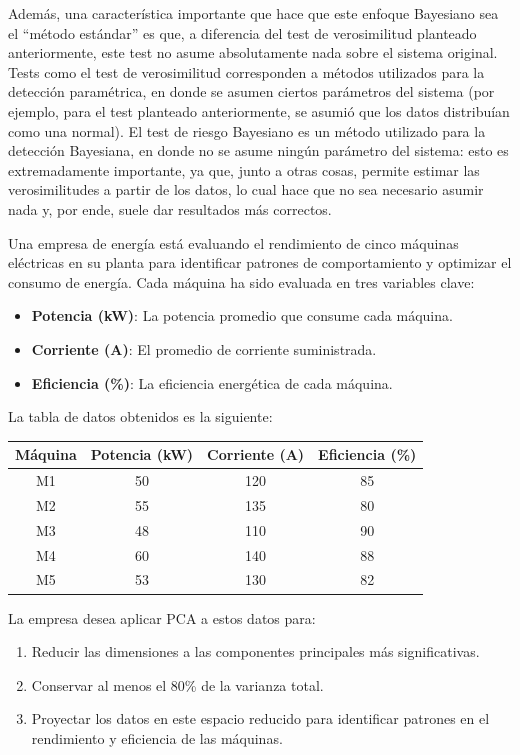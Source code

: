 \documentclass[
  11pt,
  letterpaper,
   addpoints,
   answers
  ]{exam}
\begin{document}
\begin{questions}
\begin{solution}
Además, una característica importante que hace que este enfoque Bayesiano sea el “método estándar” es que, a diferencia del test de verosimilitud planteado anteriormente, este test no asume absolutamente nada sobre el sistema original. Tests como el test de verosimilitud corresponden a métodos utilizados para la detección paramétrica, en donde se asumen ciertos parámetros del sistema (por ejemplo, para el test planteado anteriormente, se asumió que los datos distribuían como una normal). El test de riesgo Bayesiano es un método utilizado para la detección Bayesiana, en donde no se asume ningún parámetro del sistema: esto es extremadamente importante, ya que, junto a otras cosas, permite estimar las verosimilitudes a partir de los datos, lo cual hace que no sea necesario asumir nada y, por ende, suele dar resultados más correctos.

\end{solution}
\question  Una empresa de energía está evaluando el rendimiento de cinco máquinas eléctricas en su planta para identificar patrones de comportamiento y optimizar el consumo de energía. Cada máquina ha sido evaluada en tres variables clave:

\begin{itemize}
    \item \textbf{Potencia (kW)}: La potencia promedio que consume cada máquina.
    \item \textbf{Corriente (A)}: El promedio de corriente suministrada.
    \item \textbf{Eficiencia (\%)}: La eficiencia energética de cada máquina.
\end{itemize}

La tabla de datos obtenidos es la siguiente:

\begin{table}[H]
\centering
\begin{tabular}{|c|c|c|c|}
\hline
\textbf{Máquina} & \textbf{Potencia (kW)} & \textbf{Corriente (A)} & \textbf{Eficiencia (\%)} \\
\hline
M1 & 50 & 120 & 85 \\
M2 & 55 & 135 & 80 \\
M3 & 48 & 110 & 90 \\
M4 & 60 & 140 & 88 \\
M5 & 53 & 130 & 82 \\
\hline
\end{tabular}
\end{table}

La empresa desea aplicar PCA a estos datos para:
\begin{enumerate}
    \item Reducir las dimensiones a las componentes principales más significativas.
    \item Conservar al menos el 80\% de la varianza total.
    \item Proyectar los datos en este espacio reducido para identificar patrones en el rendimiento y eficiencia de las máquinas.
\end{enumerate}
\begin{solution}

\end{solution}
\end{questions}
\end{document}
